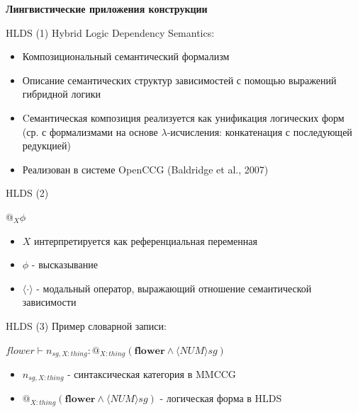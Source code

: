 \documentclass{beamer}
\begin{document}
\begin{frame}{}
\begin{center}
	\textbf{Лингвистические приложения конструкции}
\end{center}
\end{frame}

\begin{frame}{HLDS (1)}
Hybrid Logic Dependency Semantics:\\
\bigskip
\begin{itemize}
	\item Композициональный семантический формализм 
	\item Описание семантических структур зависимостей с помощью выражений гибридной логики
	\item Cемантическая композиция реализуется как унификация логических форм (ср. с формализмами на основе $\lambda$-исчисления: конкатенация с последующей редукцией)
	\item Реализован в системе OpenCCG (Baldridge et al., 2007)
\end{itemize}
\end{frame}

\begin{frame}{HLDS (2)}
\begin{center}
$@_X\phi$
\end{center}
\bigskip
\begin{itemize}
	\item $X$ интерпретируется как референциальная переменная
	\item $\phi$ - высказывание
	\item $\langle \cdot \rangle$ - модальный оператор, выражающий отношение семантической зависимости
\end{itemize}	
\end{frame}

\begin{frame}{HLDS (3)}
Пример словарной записи:\\
\bigskip
\begin{center}
$flower \vdash n_{sg,X:thing} : @_{X:thing}(\textbf{flower} \wedge \langle NUM \rangle sg)$
\end{center}
\bigskip
\begin{itemize}
	\item $n_{sg,X:thing}$ - синтаксическая категория в MMCCG
	\item $@_{X:thing}(\textbf{flower} \wedge \langle NUM \rangle sg)$ - логическая форма в HLDS
\end{itemize}	
\end{frame}
\end{document}

